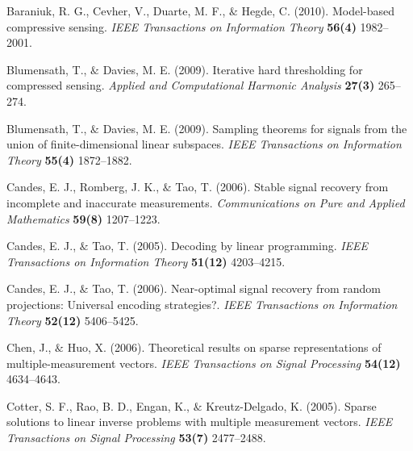 \documentclass[journal,onecolumn]{IEEEtran}
\begin{document}
%
%
%
\begin{thebibliography}{1}

Baraniuk, R. G., Cevher, V., Duarte, M. F., $\&$ Hegde, C. (2010).
Model-based compressive sensing. \textit{IEEE Transactions on Information Theory}
\textbf{56(4)} 1982--2001.

Blumensath, T., $\&$ Davies, M. E. (2009). Iterative hard thresholding for compressed sensing.  \textit{Applied and Computational Harmonic Analysis}
\textbf{27(3)} 265--274.

Blumensath, T., $\&$ Davies, M. E. (2009). Sampling theorems for signals from the union of finite-dimensional linear subspaces. \textit{IEEE Transactions on Information Theory}
\textbf{55(4)} 1872--1882.

Candes, E. J., Romberg, J. K., $\&$ Tao, T. (2006). Stable signal recovery from incomplete and inaccurate measurements. \textit{Communications on Pure and Applied Mathematics}
\textbf{59(8)} 1207--1223.

Candes, E. J., $\&$ Tao, T. (2005). Decoding by linear programming. \textit{IEEE Transactions on Information Theory}  \textbf{51(12)} 4203--4215.

Candes, E. J., $\&$ Tao, T. (2006). Near-optimal signal recovery from random projections: Universal encoding strategies?. \textit{IEEE Transactions on Information Theory}
\textbf{52(12)} 5406--5425.

Chen, J., $\&$ Huo, X. (2006). Theoretical results on sparse representations of multiple-measurement vectors. \textit{IEEE Transactions on Signal Processing} \textbf{54(12)} 4634--4643.


Cotter, S. F., Rao, B. D., Engan, K., $\&$ Kreutz-Delgado, K. (2005). Sparse solutions to linear inverse problems with multiple measurement vectors. \textit{IEEE Transactions on Signal Processing} \textbf{53(7)} 2477--2488.


\end{thebibliography}
\end{document}
